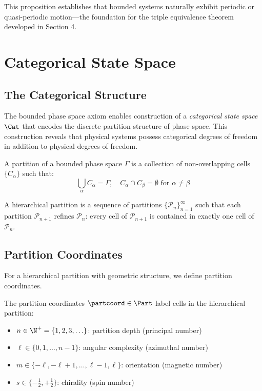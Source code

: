 This proposition establishes that bounded systems naturally exhibit periodic or quasi-periodic motion---the foundation for the triple equivalence theorem developed in Section 4.

\section{Categorical State Space}

\subsection{The Categorical Structure}

The bounded phase space axiom enables construction of a \textit{categorical state space} $\Cat$ that encodes the discrete partition structure of phase space. This construction reveals that physical systems possess categorical degrees of freedom in addition to physical degrees of freedom.

\begin{definition}
A partition of a bounded phase space $\Gamma$ is a collection of non-overlapping cells $\{C_\alpha\}$ such that:
\begin{equation}
\bigcup_\alpha C_\alpha = \Gamma, \quad C_\alpha \cap C_\beta = \emptyset \text{ for } \alpha \neq \beta
\end{equation}
\end{definition}

\begin{definition}
A hierarchical partition is a sequence of partitions $\{\mathcal{P}_n\}_{n=1}^{\infty}$ such that each partition $\mathcal{P}_{n+1}$ refines $\mathcal{P}_n$: every cell of $\mathcal{P}_{n+1}$ is contained in exactly one cell of $\mathcal{P}_n$.
\end{definition}

\subsection{Partition Coordinates}

For a hierarchical partition with geometric structure, we define partition coordinates.

\begin{definition}
\label{def:partition_coords}
The partition coordinates $\partcoord \in \Part$ label cells in the hierarchical partition:
\begin{itemize}
    \item $n \in \N^+ = \{1, 2, 3, \ldots\}$: partition depth (principal number)
    \item $\ell \in \{0, 1, \ldots, n-1\}$: angular complexity (azimuthal number)
    \item $m \in \{-\ell, -\ell+1, \ldots, \ell-1, \ell\}$: orientation (magnetic number)
    \item $s \in \{-\frac{1}{2}, +\frac{1}{2}\}$: chirality (spin number)
\end{itemize}
\end{definition}

